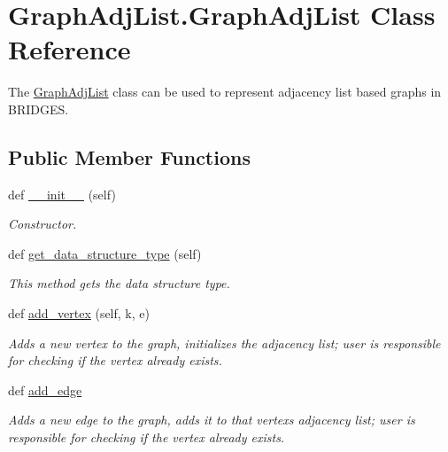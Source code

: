 \hypertarget{class_graph_adj_list_1_1_graph_adj_list}{}\section{Graph\+Adj\+List.\+Graph\+Adj\+List Class Reference}
\label{class_graph_adj_list_1_1_graph_adj_list}


The \hyperlink{class_graph_adj_list_1_1_graph_adj_list}{Graph\+Adj\+List} class can be used to represent adjacency list based graphs in B\+R\+I\+D\+G\+E\+S.  


\subsection*{Public Member Functions}
\begin{DoxyCompactItemize}
\item 
def \hyperlink{class_graph_adj_list_1_1_graph_adj_list_a045be8de7a7695b8eac07feb9011b73d}{\+\_\+\+\_\+init\+\_\+\+\_\+} (self)
\begin{DoxyCompactList}\small\item\em Constructor. \end{DoxyCompactList}\item 
def \hyperlink{class_graph_adj_list_1_1_graph_adj_list_a0873bf9cd2692115646dee217811cb62}{get\+\_\+data\+\_\+structure\+\_\+type} (self)
\begin{DoxyCompactList}\small\item\em This method gets the data structure type. \end{DoxyCompactList}\item 
def \hyperlink{class_graph_adj_list_1_1_graph_adj_list_a5a294f7b3f521afe18da536d6a444eb9}{add\+\_\+vertex} (self, k, e)
\begin{DoxyCompactList}\small\item\em Adds a new vertex to the graph, initializes the adjacency list; user is responsible for checking if the vertex already exists. \end{DoxyCompactList}\item 
def \hyperlink{class_graph_adj_list_1_1_graph_adj_list_ad59c07529316dd547e1fe86ccfd54bb2}{add\+\_\+edge}
\begin{DoxyCompactList}\small\item\em Adds a new edge to the graph, adds it to that vertex\textquotesingle{}s adjacency list; user is responsible for checking if the vertex already exists. \end{DoxyCompactList}\item 

\end{DoxyCompactItemize}
